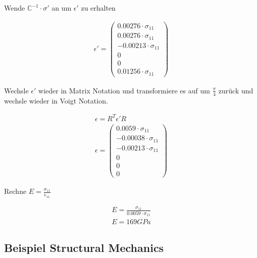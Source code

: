 Wende $\mathbb{C}^{-1} \cdot \sigma'$ an um $\epsilon'$ zu erhalten

\begin{align}
	\epsilon'=\begin{pmatrix}
		0.00276 \cdot \sigma_{11} \\
		0.00276 \cdot \sigma_{11} \\
		-0.00213 \cdot \sigma_{11} \\
		0 \\
		0 \\
		0.01256 \cdot \sigma_{11}
	\end{pmatrix}
\end{align}

Wechsle $\epsilon'$ wieder in Matrix Notation und transformiere es auf um
$\frac{\pi}{4}$ zurück und wechsle wieder in Voigt Notation.

\begin{align}
	\epsilon=R^{T}\epsilon'R \\
	\epsilon=\begin{pmatrix}
		0.0059 \cdot \sigma_{11} \\
		-0.00038 \cdot \sigma_{11} \\
		-0.00213 \cdot \sigma_{11} \\
		0 \\
		0 \\
		0
	\end{pmatrix}
\end{align}

Rechne $E=\frac{\sigma_{11}}{\epsilon_{11}}$

\begin{align}
	E=\frac{\sigma_{11}}{0.0059 \cdot \sigma_{11}} \\
	E=169GPa
\end{align}

\subsection{Beispiel Structural Mechanics} %

